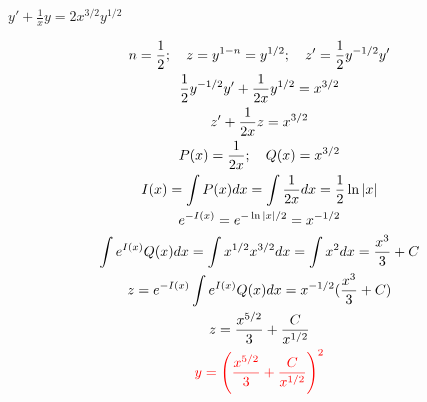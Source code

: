 \item [2.] $y' + \frac{1}{x}y = 2x^{3/2}y^{1/2}$

\textcolor{blue}{
    \begin{gather*}
        n = \frac{1}{2}; \quad z=y^{1-n}=y^{1/2};\quad z' = \frac{1}{2}y^{-1/2}y'\\
        \frac{1}{2}y^{-1/2}y' + \frac{1}{2x}y^{1/2} = x^{3/2}\\
        z'+\frac{1}{2x}z=x^{3/2}\\
        P(x)=\frac{1}{2x}; \quad Q(x)=x^{3/2}\\
        I(x)=\int P(x)dx = \int \frac{1}{2x}dx=\frac{1}{2}\ln|x|\\
        e^{-I(x)}=e^{-\ln|x|/2}=x^{-1/2}\\
        \int e^{I(x)}Q(x)dx=\int x^{1/2}x^{3/2}dx=\int x^2dx=\frac{x^3}{3}+C\\
        z=e^{-I(x)}\int e^{I(x)}Q(x)dx=x^{-1/2}(\frac{x^3}{3}+C)\\
        z=\frac{x^{5/2}}{3}+\frac{C}{x^{1/2}}\\
        \textcolor{red}{
        y=\Bigg(\frac{x^{5/2}}{3}+\frac{C}{x^{1/2}}\Bigg)^2
        }
    \end{gather*}
}